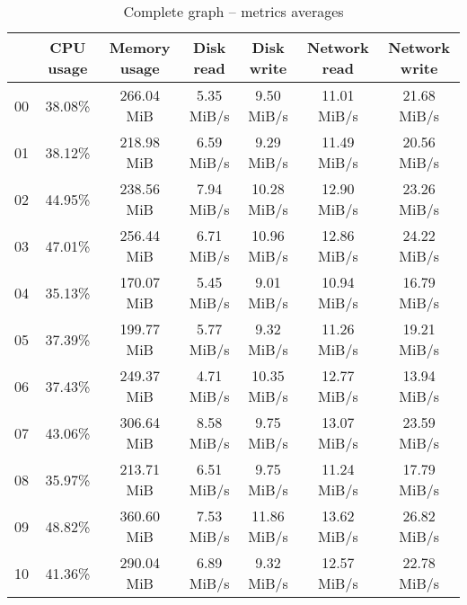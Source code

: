 \begin{table}[H]
\begin{center}
\caption{Complete graph -- metrics averages}
\label{tab:graph-complete-avg}
\begin{tabular}{|c|c|c|c|c|c|c|}
\hline
   & CPU usage & Memory usage & Disk read & Disk write & Network read & Network write\\
\hline
00 & 38.08\% & 266.04 MiB & 5.35 MiB/s & 9.50 MiB/s & 11.01 MiB/s & 21.68 MiB/s\\
01 & 38.12\% & 218.98 MiB & 6.59 MiB/s & 9.29 MiB/s & 11.49 MiB/s & 20.56 MiB/s\\
02 & 44.95\% & 238.56 MiB & 7.94 MiB/s & 10.28 MiB/s & 12.90 MiB/s & 23.26 MiB/s\\
03 & 47.01\% & 256.44 MiB & 6.71 MiB/s & 10.96 MiB/s & 12.86 MiB/s & 24.22 MiB/s\\
04 & 35.13\% & 170.07 MiB & 5.45 MiB/s & 9.01 MiB/s & 10.94 MiB/s & 16.79 MiB/s\\
05 & 37.39\% & 199.77 MiB & 5.77 MiB/s & 9.32 MiB/s & 11.26 MiB/s & 19.21 MiB/s\\
06 & 37.43\% & 249.37 MiB & 4.71 MiB/s & 10.35 MiB/s & 12.77 MiB/s & 13.94 MiB/s\\
07 & 43.06\% & 306.64 MiB & 8.58 MiB/s & 9.75 MiB/s & 13.07 MiB/s & 23.59 MiB/s\\
08 & 35.97\% & 213.71 MiB & 6.51 MiB/s & 9.75 MiB/s & 11.24 MiB/s & 17.79 MiB/s\\
09 & 48.82\% & 360.60 MiB & 7.53 MiB/s & 11.86 MiB/s & 13.62 MiB/s & 26.82 MiB/s\\
10 & 41.36\% & 290.04 MiB & 6.89 MiB/s & 9.32 MiB/s & 12.57 MiB/s & 22.78 MiB/s\\
\hline
\end{tabular}
\end{center}
\end{table}
